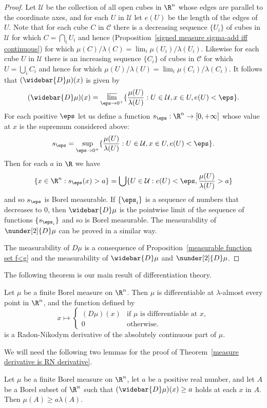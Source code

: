 \begin{proof}
Let $\mathcal{U}$ be the collection of all open cubes in $\R^n$ whose edges are parallel to the coordinate axes, and for each $U$ in $\mathcal{U}$ let $e(U)$ be the length of the edges of $U$. Note that for each cube $C$ in $\mathcal{C}$ there is a decreasing sequence $\{U_i\}$ of cubes in $\mathcal{U}$ for which $C=\bigcap_iU_i$ and hence (Proposition~\ref{signed measure sigma-add iff continuous}) for which $\mu(C)/\lambda(C)=\lim_i\mu(U_i)/\lambda(U_i)$. Likewise for each cube $U$ in $\mathcal{U}$ there is an increasing sequence $\{C_i\}$ of cubes in $\mathcal{C}$ for which $U=\bigcup_iC_i$ and hence for which $\mu(U)/\lambda(U)=\lim_i\mu(C_i)/\lambda(C_i)$. It follows that $(\widebar{D}\mu)(x)$ is given by
\[(\widebar{D}\mu)(x)=\varlimsup_{\eps\to 0^+}\{\frac{\mu(U)}{\lambda(U)}:U\in\mathcal{U},x\in U,e(U)<\eps\}.\]
For each positive $\eps$ let us define a function $s_\eps:\R^n\to[0,+\infty]$ whose value at $x$ is the supremum considered above:
\[s_\eps=\sup_{\eps\to 0^+}\{\frac{\mu(U)}{\lambda(U)}:U\in\mathcal{U},x\in U,e(U)<\eps\}.\]
Then for each $a$ in $\R$ we have
\[\{x\in\R^n:s_\eps(x)>a\}=\bigcup\{U\in\mathcal{U}:e(U)<\eps,\frac{\mu(U)}{\lambda(U)}>a\}\]
and so $s_\eps$ is Borel measurable. If $\{\eps_i\}$ is a sequence of numbers that decreases to $0$, then $\widebar{D}\mu$ is the pointwise limit of the sequence of functions $\{s_{\eps_i}\}$ and so is Borel measurable. The measurability of $\nunder[2]{D}\mu$ can be proved in a similar way.\par
The measurability of $D\mu$ is a consequence of Proposition~\ref{measurable function set f<g} and the measurability of $\widebar{D}\mu$ and $\nunder[2]{D}\mu$.
\end{proof}
The following theorem is our main result of differentiation theory.
\begin{theorem}\label{measure derivative is RN derivative}
Let $\mu$ be a finite Borel measure on $\R^n$. Then $\mu$ is differentiable at $\lambda$-almost every point in $\R^n$, and the function defined by
\[x\mapsto\begin{cases}
(D\mu)(x)&\text{if $\mu$ is differentiable at $x$},\\
0&\text{otherwise}.
\end{cases}\]
is a Radon-Nikodym derivative of the absolutely continuous part of $\mu$.
\end{theorem}
We will need the following two lemmas for the proof of Theorem~\ref{measure derivative is RN derivative}.
\begin{lemma}\label{measure upper derivative inequality}
Let $\mu$ be a finite Borel measure on $\R^n$, let $a$ be a positive real number, and let $A$ be a Borel subset of $\R^n$ such that $(\widebar{D}\mu)(x)\geq a$ holds at each $x$ in $A$. Then $\mu(A)\geq a\lambda(A)$.
\end{lemma}
